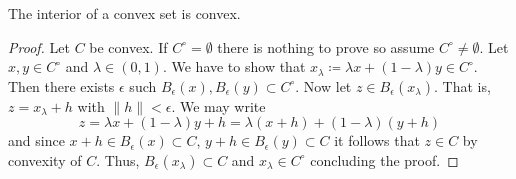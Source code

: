 \begin{lemma}
    The interior of a convex set is convex.
\end{lemma}
\begin{proof}
    Let $C$ be convex. If $C^\circ=\emptyset$ there is nothing to prove so assume $C^\circ\neq \emptyset$. 
    Let $x,y\in C^\circ$ and $\lambda\in (0,1)$. We have to show that $x_\lambda\coloneqq\lambda x + (1-\lambda)y\in C^\circ$.
    Then there exists $\epsilon$ such $B_\epsilon(x),B_\epsilon(y)\subset C^\circ$. Now let $z\in B_{\epsilon}(x_\lambda)$. That is, $z=x_\lambda + h$ with $\|h\|<\epsilon$. We may write
    \begin{equation}
        z = \lambda x + (1-\lambda)y + h = \lambda (x+h) + (1-\lambda)(y + h)
    \end{equation}
    and since $x+h\in B_\epsilon(x)\subset C$, $y+h\in B_\epsilon(y)\subset C$ it follows that $z\in C$ by convexity of $C$. Thus, $B_\epsilon(x_\lambda)\subset C$ and $x_\lambda\in C^\circ$ concluding the proof.
\end{proof}

